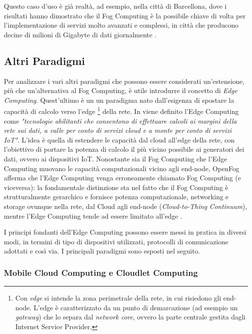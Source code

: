 Questo caso d'uso è già realtà, ad esempio, nella città di Barcellona, dove i risultati hanno dimostrato che il Fog Computing è la possibile chiave di volta per l'implementazione di servizi molto avanzati e complessi, in città che producono decine di milioni di Gigabyte di dati giornalmente \cite{FogBarcellona}. 

\subsection{Altri Paradigmi}

Per analizzare i vari altri paradigmi che possono essere considerati un'estensione, più che un'alternativa al Fog Computing, è utile introdurre il concetto di \textit{Edge Computing}. Quest'ultimo è un un paradigma nato dall'esigenza di spostare la capacità di calcolo verso l'edge \footnote{Con \textit{edge} si intende la zona perimetrale della rete, in cui risiedono gli end-node. L'edge è caratterizzato da un punto di demarcazione (ad esempio un \textit{gateway}) che lo separa dal \textit{network core}, ovvero la parte centrale gestita dagli Internet Service Provider.} della rete. In \cite{EdgeComputing} viene definito l'Edge Computing come \textit{"tecnologie abilitanti che consentono di effettuare calcoli ai margini della rete sui dati, a valle per conto di servizi cloud e a monte per conto di servizi IoT"}. L'idea è quella di estendere le capacità dal cloud all'edge della rete, con l'obiettivo di portare la potenza di calcolo il più vicino possibile ai generatori dei dati, ovvero ai dispositivi IoT. Nonostante sia il Fog Computing che l'Edge Computing muovano le capacità computazionali vicino agli end-node, OpenFog afferma che l'Edge Computing venga erroneamente chiamato Fog Computing (e viceversa): la fondamentale distinzione sta nel fatto che il Fog Computing è strutturalmente gerarchico e fornisce potenza computazionale, networking e storage ovunque nella rete, dal Cloud agli end-node (\textit{Cloud-to-Thing Continuum}), mentre l'Edge Computing tende ad essere limitato all'edge \cite{OpenFogReferenceArchitecture}.

I principi fondanti dell'Edge Computing possono essere messi in pratica in diversi modi, in termini di tipo di dispositivi utilizzati, protocolli di comunicazione adottati e così via. I principali paradigmi sono esposti nel seguito.

\subsubsection{Mobile Cloud Computing e Cloudlet Computing}

